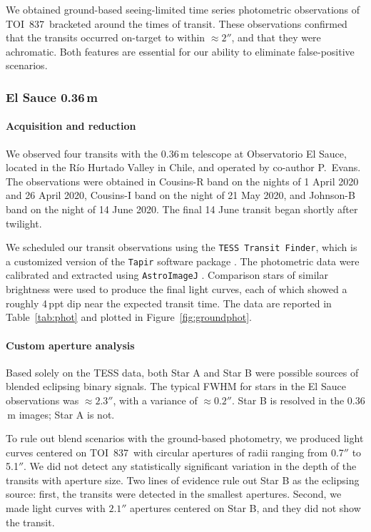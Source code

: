 \documentclass[12pt,twocolumn,tighten]{aastex63}
\newcommand{\tn}{TOI~837} %
\begin{document}
We obtained ground-based seeing-limited time series photometric
observations of \tn\ bracketed around the times of transit.  These
observations confirmed that the transits occurred on-target to within
$\approx 2''$, and that they were achromatic. Both features are
essential for our ability to eliminate false-positive scenarios.

\subsubsection{El Sauce 0.36$\,$m}

\paragraph{Acquisition and reduction}
We observed four transits with the 0.36$\,$m telescope at Observatorio
El Sauce, located in the R\'io Hurtado Valley in Chile, and operated
by co-author P{.}~Evans.  The observations were obtained in Cousins-R
band on the nights of 1 April 2020 and 26 April 2020, Cousins-I band
on the night of 21 May 2020, and Johnson-B band on the night of 14
June 2020.  The final 14 June transit began shortly after twilight.

We scheduled our transit observations using the {\tt TESS Transit
Finder}, which is a customized version of the {\tt Tapir} software
package \citep{Jensen:2013}.  The photometric data were calibrated and
extracted using \texttt{AstroImageJ} \citep{collins_astroimagej_2017}.
Comparison stars of similar brightness were used to produce the final
light curves, each of which showed a roughly 4$\,$ppt dip near the
expected transit time.  The data are reported in Table~\ref{tab:phot}
and plotted in Figure~\ref{fig:groundphot}.


\paragraph{Custom aperture analysis}
Based solely on the TESS data, both Star A and Star B were possible
sources of blended eclipsing binary signals.  The typical FWHM for
stars in the El Sauce observations was $\approx 2.3''$, with a
variance of $\approx 0.2''$.  Star B is resolved in the 0.36$\,$m
images; Star A is not.

To rule out blend scenarios with the ground-based photometry, we
produced light curves centered on \tn\ with circular apertures of
radii ranging from 0.7$''$ to 5.1$''$.  We did not detect any
statistically significant variation in the depth of the transits with
aperture size.  Two lines of evidence rule out Star B as the eclipsing
source: first, the transits were detected in the smallest apertures.
Second, we made light curves with $2.1''$ apertures centered on Star
B, and they did not show the transit.
\end{document}
